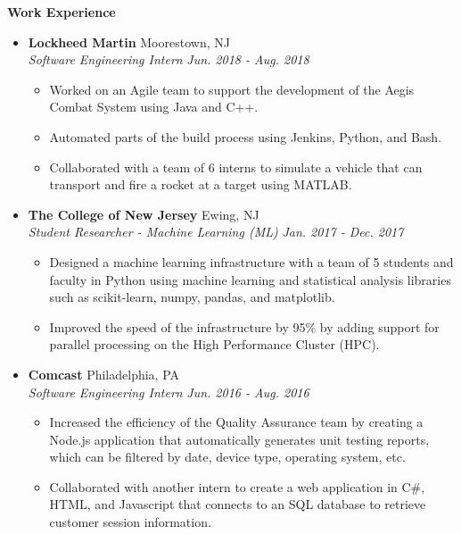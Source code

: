 \documentclass[letterpaper,10pt]{article}
\newcommand{\resitem}[1]{\item #1 \vspace{-2pt}}
\newcommand{\resheading}[1]{{\large \colorbox{mygrey}{\begin{minipage}{\textwidth}{\textbf{#1 \vphantom{p\^{E}}}}\end{minipage}}}}
\newcommand{\ressubheading}[4]{%
  \item\textbf{#1} \hfill #2\null\\
  \textit{#3} \hfill \textit{#4}%
  \vspace{-5pt}
}%
\begin{document}
\resheading{Work Experience}
\begin{itemize}
\ressubheading{Lockheed Martin}{Moorestown, NJ}{Software Engineering Intern}{Jun. 2018 - Aug. 2018}
	\begin{itemize}
		\resitem{Worked on an Agile team to support the development of the Aegis Combat System using Java and C++.}
		\resitem{Automated parts of the build process using Jenkins, Python, and Bash.}
		\resitem{Collaborated with a team of 6 interns to simulate a vehicle that can transport and fire a rocket at a target using MATLAB.}
	\end{itemize}	

\ressubheading{The College of New Jersey}{Ewing, NJ}{Student Researcher - Machine Learning (ML)}{Jan. 2017 - Dec. 2017}
	\begin{itemize}
		\resitem{Designed a machine learning infrastructure with a team of 5 students and faculty in Python using machine learning and statistical analysis libraries such as scikit-learn, numpy, pandas, and matplotlib.}
		\resitem{Improved the speed of the infrastructure by 95\% by adding support for parallel processing on the High Performance Cluster (HPC).}
		\end{itemize}

\ressubheading{Comcast}{Philadelphia, PA}{Software Engineering Intern}{Jun. 2016 - Aug. 2016}
	\begin{itemize}
		\resitem{Increased the efficiency of the Quality Assurance team by creating a Node.js application that automatically generates unit testing reports, which can be filtered by date, device type, operating system, etc.}
		\resitem{Collaborated with another intern to create a web application in C\#, HTML, and Javascript that connects to an SQL database to retrieve customer session information.}
	\end{itemize}
\end{itemize}
\end{document}
